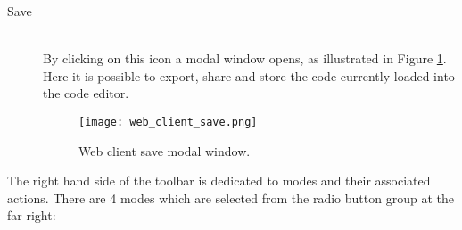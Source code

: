 \begin{description}
  \item[ Save]~\\
    By clicking on this icon a modal window opens, as illustrated in Figure \ref{fig:web_client_save}. Here it is possible to export, share and store the code currently loaded into the code editor.
    \begin{figure}
      \texttt{[image: web\_client\_save.png]}
      \caption{Web client save modal window.}
      \label{fig:web_client_save}
    \end{figure}

\end{description}

The right hand side of the toolbar is dedicated to modes and their associated actions. There are 4 modes which are selected from the radio button group at the far right:

